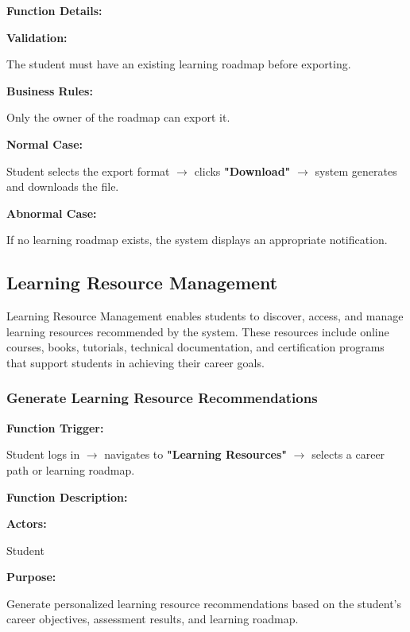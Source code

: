 \vspace{0.3cm}

\textbf{Function Details:}

\textbf{Validation:}

The student must have an existing learning roadmap before exporting.

\textbf{Business Rules:}

Only the owner of the roadmap can export it.

\textbf{Normal Case:}

Student selects the export format $\rightarrow$ clicks \textbf{"Download"} $\rightarrow$ system generates and downloads the file.

\textbf{Abnormal Case:}

If no learning roadmap exists, the system displays an appropriate notification.

\subsection{Learning Resource Management}

Learning Resource Management enables students to discover, access, and manage learning resources recommended by the system. These resources include online courses, books, tutorials, technical documentation, and certification programs that support students in achieving their career goals.

\subsubsection{Generate Learning Resource Recommendations}

\textbf{Function Trigger:}

Student logs in $\rightarrow$ navigates to \textbf{"Learning Resources"} $\rightarrow$ selects a career path or learning roadmap.

\vspace{0.3cm}

\textbf{Function Description:}

\textbf{Actors:}

Student

\vspace{0.2cm}

\textbf{Purpose:}

Generate personalized learning resource recommendations based on the student's career objectives, assessment results, and learning roadmap.

